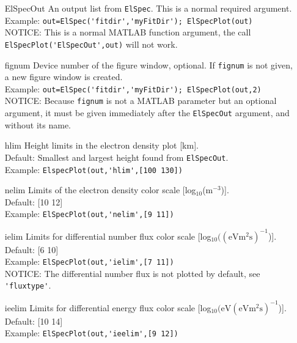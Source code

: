 \documentclass[12pt,a4paper]{report}
\begin{document}
\begin{itemize}
\item[ElSpecOut] An output list from \verb|ElSpec|. This is a normal required argument. \\
Example: \verb|out=ElSpec('fitdir','myFitDir'); ElSpecPlot(out)|\\
NOTICE: This is a normal MATLAB function argument, the call \\\verb|ElSpecPlot('ElSpecOut',out)| will not work.\\

\item[fignum] Device number of the figure window, optional. If \verb|fignum| is not given, a new figure window is created. \\
Example: \verb|out=ElSpec('fitdir','myFitDir'); ElSpecPlot(out,2)|\\
NOTICE: Because \verb|fignum| is not a MATLAB parameter but an optional argument, it must be given immediately after the \verb|ElSpecOut| argument, and without its name. 

\item[hlim] Height limits in the electron density plot [km]. \\
Default: Smallest and largest height found from \verb|ElSpecOut|.\\
Example: \verb|ElspecPlot(out,'hlim',[100 130])|\\

\item[nelim] Limits of the electron density color scale [log$_{10}$(m$^{-3}$)].\\
Default: [10 12]\\
Example: \verb|ElSpecPlot(out,'nelim',[9 11])|\\

\item[ielim] Limits for differential number flux color scale [log$\mathrm{_{10}((eVm^2s)^{-1}}$)].\\
Default: [6 10]\\
Example: \verb|ElSpecPlot(out,'ielim',[7 11])|\\
NOTICE: The differential number flux is not plotted by default, see \verb|'fluxtype'|.\\

\item[ieelim] Limits for differential energy flux color scale [log$\mathrm{_{10}(eV(eVm^2s)^{-1}}$)].\\
Default: [10 14]\\
Example: \verb|ElSpecPlot(out,'ieelim',[9 12])|\\


\end{itemize}
\end{document}
